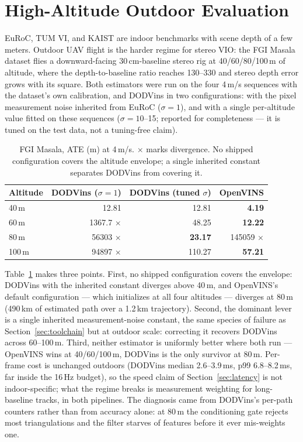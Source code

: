 \documentclass[10pt,conference,letterpaper]{IEEEtran}
\begin{document}
\section{High-Altitude Outdoor Evaluation}
\label{sec:fgi}

EuRoC, TUM VI, and KAIST are indoor benchmarks with scene depth of a few
meters. Outdoor UAV flight is the harder regime for stereo VIO: the FGI
Masala dataset \cite{george2023fgi} flies a downward-facing 30\,cm-baseline
stereo rig at 40/60/80/100\,m of altitude, where the depth-to-baseline
ratio reaches 130--330 and stereo depth error grows with its square. Both
estimators were run on the four 4\,m/s sequences with the dataset's own
calibration, and DODVins in two configurations: with the pixel measurement
noise inherited from EuRoC ($\sigma{=}1$), and with a single per-altitude
value fitted on these sequences ($\sigma{=}10$--15; reported for
completeness --- it is tuned on the test data, not a tuning-free claim).

\begin{table}[t]
\caption{FGI Masala, ATE (m) at 4\,m/s. $\times$ marks divergence. No
shipped configuration covers the altitude envelope; a single inherited
constant separates DODVins from covering it.}
\label{tab:fgi}
\centering
\begin{tabular}{lrrr}
\toprule
Altitude & DODVins ($\sigma{=}1$) & DODVins (tuned $\sigma$) & OpenVINS \\
\midrule
40\,m  & 12.81 & 12.81 & \textbf{4.19} \\
60\,m  & 1367.7 $\times$ & 48.25 & \textbf{12.22} \\
80\,m  & 56303 $\times$ & \textbf{23.17} & 145059 $\times$ \\
100\,m & 94897 $\times$ & 110.27 & \textbf{57.21} \\
\bottomrule
\end{tabular}
\end{table}

Table~\ref{tab:fgi} makes three points. First, no shipped configuration
covers the envelope: DODVins with the inherited constant diverges above
40\,m, and OpenVINS's default configuration --- which initializes at all
four altitudes --- diverges at 80\,m (490\,km of estimated path over a
1.2\,km trajectory). Second, the dominant lever is a single inherited
measurement-noise constant, the same species of failure as
Section~\ref{sec:toolchain} but at outdoor scale: correcting it recovers
DODVins across 60--100\,m. Third, neither estimator is uniformly better
where both run --- OpenVINS wins at 40/60/100\,m, DODVins is the only
survivor at 80\,m. Per-frame cost is unchanged outdoors (DODVins median
2.6--3.9\,ms, p99 6.8--8.2\,ms, far inside the 16\,Hz budget), so the
speed claim of Section~\ref{sec:latency} is not indoor-specific; what the
regime breaks is measurement weighting for long-baseline tracks, in both
pipelines. The diagnosis came from DODVins's per-path counters rather
than from accuracy alone: at 80\,m the conditioning gate rejects most
triangulations and the filter starves of features before it ever
mis-weights one.
\end{document}
